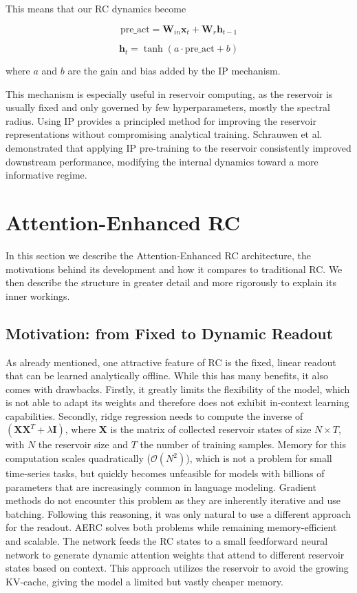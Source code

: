 \documentclass{sapthesis}
\begin{document}
This means that our RC dynamics become

\[
  \text{pre\_act} = \mathbf{W}_{in} \mathbf{x}_t + \mathbf{W}_r \mathbf{h}_{t-1}
\]

\[
  \mathbf{h}_t = \tanh(a \cdot \text{pre\_act} + b)
\]

where $a$ and $b$ are the gain and bias added by the IP mechanism.

This mechanism is especially useful in reservoir computing, as the reservoir is usually fixed and only governed by few hyperparameters, mostly the spectral radius. Using IP provides a principled method for improving the reservoir representations without compromising analytical training. Schrauwen et al.~\cite{10.1016/j.neucom.2007.12.020} demonstrated that applying IP pre-training to the reservoir consistently improved downstream performance, modifying the internal dynamics toward a more informative regime.

\section{Attention-Enhanced RC}
In this section we describe the Attention-Enhanced RC architecture, the motivations behind its development and how it compares to traditional RC. We then describe the structure in greater detail and more rigorously to explain its inner workings.

\subsection{Motivation: from Fixed to Dynamic Readout}
As already mentioned, one attractive feature of RC is the fixed, linear readout that can be learned analytically offline. While this has many benefits, it also comes with drawbacks. Firstly, it greatly limits the flexibility of the model, which is not able to adapt its weights and therefore does not exhibit in-context learning capabilities. Secondly, ridge regression needs to compute the inverse of $(\mathbf{X}\mathbf{X}^T + \lambda\mathbf{I})$, where $\mathbf{X}$ is the matrix of collected reservoir states of size $N\times T$, with $N$ the reservoir size and $T$ the number of training samples. Memory for this computation scales quadratically ($\mathcal{O}(N^2)$), which is not a problem for small time-series tasks, but quickly becomes unfeasible for models with billions of parameters that are increasingly common in language modeling.
Gradient methods do not encounter this problem as they are inherently iterative and use batching.
Following this reasoning, it was only natural to use a different approach for the readout. AERC solves both problems while remaining memory-efficient and scalable. The network feeds the RC states to a small feedforward neural network to generate dynamic attention weights that attend to different reservoir states based on context. This approach utilizes the reservoir to avoid the growing KV-cache, giving the model a limited but vastly cheaper memory.
\end{document}
